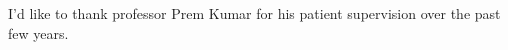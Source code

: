 

\begin{acknowledgements}      %

    I'd like to thank professor Prem Kumar for his patient supervision over the past few years.
\end{acknowledgements}



